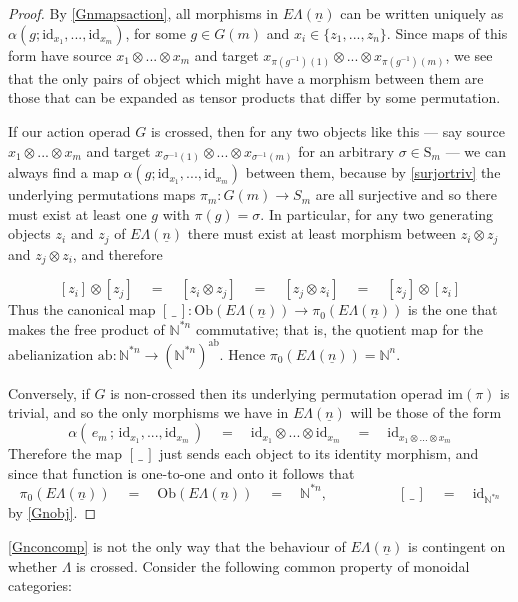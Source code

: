 \documentclass{amsbook} %
\newcommand{\ELn}{E\Lambda(\underline{n})}
\numberwithin{section}{chapter}
\begin{document}
\begin{proof}
By \cref{Gnmapsaction}, all morphisms in $\ELn$ can be written uniquely as $\alpha(g; \mathrm{id}_{x_1}, ..., \mathrm{id}_{x_m})$, for some $g \in G(m)$ and $x_i \in \{z_1, ..., z_n \}$. Since maps of this form have source $x_1 \otimes ... \otimes x_m$ and target $x_{\pi(g^{-1})(1)} \otimes ... \otimes x_{\pi(g^{-1})(m)}$, we see that the only pairs of object which might have a morphism between them are those that can be expanded as tensor products that differ by some permutation. 


If our action operad $G$ is crossed, then for any two objects like this --- say source $x_1 \otimes ... \otimes x_m$ and target $x_{\sigma^{-1}(1)} \otimes ... \otimes x_{\sigma^{-1}(m)}$ for an arbitrary $\sigma \in \mathrm{S}_m$ --- we can always find a map $\alpha(g; \mathrm{id}_{x_1}, ..., \mathrm{id}_{x_m})$ between them, because by \cref{surjortriv} the underlying permutations maps $\pi_m: G(m) \to S_m$ are all surjective and so there must exist at least one $g$ with $\pi(g) = \sigma$. In particular, for any two generating objects $z_i$ and $z_j$ of $\ELn$ there must exist at least morphism between $z_i \otimes z_j$ and $z_j \otimes z_i$, and therefore

\[ [z_i] \otimes [z_j] \quad = \quad [z_i \otimes z_j] \quad = \quad [z_j \otimes z_i] \quad = \quad [z_j] \otimes [z_i] \]
Thus the canonical map $[ \, \_ \, ] : \mathrm{Ob}(\ELn) \to \pi_0(\ELn)$ is the one that makes the free product of $\mathbb{N}^{*n}$ commutative; that is, the quotient map for the abelianization $\mathrm{ab} : \mathbb{N}^{*n} \to (\mathbb{N}^{*n})^{\mathrm{ab}}$. Hence $\pi_0(\ELn) = \mathbb{N}^n$.

Conversely, if $G$ is non-crossed then its underlying permutation operad $\mathrm{im}(\pi)$ is trivial, and so the only morphisms we have in $\ELn$ will be those of the form
\[ \alpha( \, e_m \, ; \, \mathrm{id}_{x_1}, ..., \mathrm{id}_{x_m} \, ) \quad = \quad \mathrm{id}_{x_1} \otimes ... \otimes \mathrm{id}_{x_m} \quad = \quad \mathrm{id}_{x_1 \otimes ... \otimes x_m} \]
Therefore the map $[ \, \_ \,]$ just sends each object to its identity morphism, and since that function is one-to-one and onto it follows that
\[ \pi_0(\ELn) \quad = \quad \mathrm{Ob}(\ELn) \quad = \quad \mathbb{N}^{\ast n}, \quad \quad \quad \quad \quad [ \, \_ \,] \quad = \quad \mathrm{id}_{\mathbb{N}^{*n}} \]
by \cref{Gnobj}.
\end{proof}

\cref{Gnconcomp} is not the only way that the behaviour of $\ELn$ is contingent on whether $\Lambda$ is crossed. Consider the following common property of monoidal categories:
\end{document}
